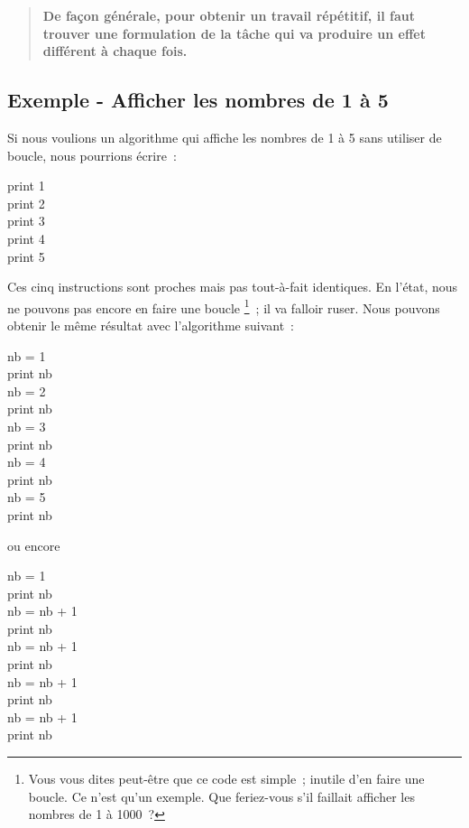 	\begin{quote}
		\bfseries
		De façon générale,
		pour obtenir un travail répétitif,
		il faut trouver une formulation de la tâche
		qui va produire un effet différent à chaque fois.
	\end{quote}
	
	\subsection{Exemple - Afficher les nombres de 1 à 5}
	
		Si nous voulions un algorithme qui affiche les nombres de 1 à 5
		sans utiliser de boucle, nous pourrions écrire~:

		\begin{langagenaturel}
			print 1\\
			print 2\\
			print 3\\
			print 4\\
			print 5\\
		\end{langagenaturel}	
		
		Ces cinq instructions sont proches mais pas tout-à-fait identiques. 
		En l’état, nous ne pouvons pas encore en faire une boucle%
		\footnote{%
			Vous vous dites peut-être que ce code est simple~;
			inutile d’en faire une boucle.
			Ce n’est qu’un exemple.
			Que feriez-vous s’il faillait afficher les nombres
			de 1 à 1000~?
		}~;
		il va falloir ruser.
		Nous pouvons obtenir le même résultat avec l’algorithme suivant~:

		\begin{minipage}{5cm}
			\begin{langagenaturel}
				nb = 1\\
				print nb\\
				nb = 2\\
				print nb\\
				nb = 3\\
				print nb\\
				nb = 4\\
				print nb\\
				nb = 5\\
				print nb\\
			\end{langagenaturel}
		\end{minipage}
		\quad ou encore \quad
		\begin{minipage}{5cm}
			\begin{langagenaturel}
				nb = 1\\
				print nb\\
				nb = nb + 1\\
				print nb\\
				nb = nb + 1\\
				print nb\\
				nb = nb + 1\\
				print nb\\
				nb = nb + 1\\
				print nb\\
			\end{langagenaturel}
		\end{minipage}
		
